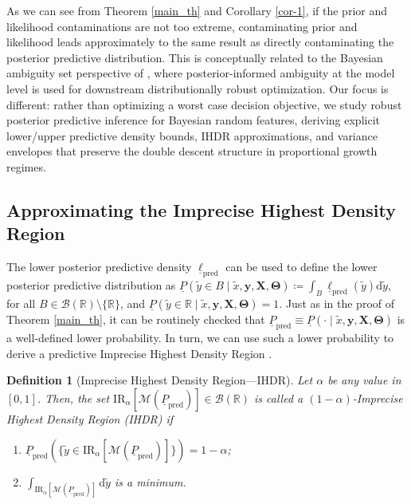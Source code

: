 \documentclass[12pt, english, oneside, a4paper]{article}
\newtheorem{definition}[theorem]{Definition}
\newcommand{\y}{\boldsymbol{y}}
\newcommand{\X}{\boldsymbol{X}}
\newcommand{\bT}{\boldsymbol{\Theta}}
\begin{document}
As we can see from Theorem \ref{main_th} and Corollary \ref{cor-1}, if the prior and likelihood contaminations are not too extreme, contaminating prior and likelihood leads approximately to the same result as directly contaminating the posterior predictive distribution. 
This is conceptually related to the Bayesian ambiguity set perspective of \citet{dellaporta2024distributionally}, where posterior-informed ambiguity at the model level is used for downstream distributionally robust optimization. Our focus is different: rather than optimizing a worst case decision objective, we study robust posterior predictive inference for Bayesian random features, deriving explicit lower/upper predictive density bounds, IHDR approximations, and variance envelopes that preserve the double descent structure in proportional growth regimes.



\subsection{Approximating the Imprecise Highest Density Region}\label{surrogate-sec}

The lower posterior predictive density $\underline{\ell}_\text{pred}$ can be used to define the lower posterior predictive distribution as $\underline{P}(\tilde{y} \in B \mid \tilde{x},\y,\X,\bT)\coloneqq \int_B \underline{\ell}_\text{pred}(\tilde{y}) \text{d}\tilde{y}$, for all $B \in \mathcal{B}(\mathbb{R})\setminus \{\mathbb{R}\}$, and $\underline{P}(\tilde{y} \in \mathbb{R} \mid \tilde{x},\y,\X,\bT)=1$. Just as in the proof of Theorem \ref{main_th}, it can be routinely checked that $\underline{P}_\text{pred} \equiv \underline{P}(\cdot \mid \tilde{x},\y,\X,\bT)$ is a well-defined lower probability. In turn, we can use such a lower probability to derive a predictive Imprecise Highest Density Region \citep{coolen}.

\begin{definition}[Imprecise Highest Density Region---IHDR]\label{ihdr-def}
   Let $\alpha$ be any value in $[0,1]$. Then, the set $\text{IR}_\alpha[\mathcal{M}(\underline{P}_\text{pred})] \in \mathcal{B}(\mathbb{R})$ is called a $(1-\alpha)$-Imprecise Highest Density Region (IHDR) if 
    \begin{enumerate}
        \item \label{cond-1} $\underline{P}_\text{pred}\left(\{\tilde{y}\in \text{IR}_\alpha[\mathcal{M}(\underline{P}_\text{pred})]\}\right)= 1-\alpha$;
        \item \label{cond-2} $\int_{\text{IR}_\alpha[\mathcal{M}(\underline{P}_\text{pred})]} \text{d}\tilde{y}$ is a minimum. 
    \end{enumerate}
\end{definition}
\end{document}
